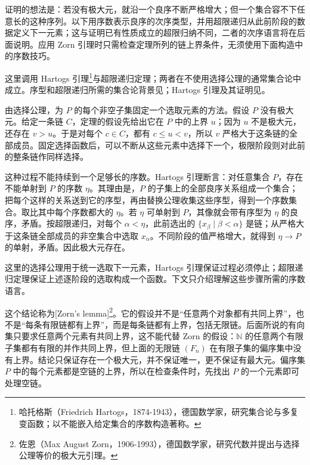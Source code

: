 \begin{proofsketch}
	证明的想法是：若没有极大元，就沿一个良序不断严格增大；但一个集合容不下任意长的这种序列。以下用序数表示良序的次序类型，并用超限递归从此前阶段的数据定义下一元素；这与证明已有性质成立的超限归纳不同，二者的次序语言将在后面说明。应用 Zorn 引理时只需检查定理所列的链上界条件，无须使用下面构造中的序数技巧。

	这里调用 Hartogs 引理\footnote{哈托格斯（Friedrich Hartogs，1874-1943），德国数学家，研究集合论与多复变函数；以不能嵌入给定集合的序数构造著称。}与超限递归定理；两者在不使用选择公理的通常集合论中成立。序型和超限递归所需的集合论背景见\cite[Chapters 5--6]{Johnstone1987LogicSetTheory}；Hartogs 引理及其证明见\cite[Lemma 7.1]{Johnstone1987LogicSetTheory}。

	由选择公理，为 \(P\) 的每个非空子集固定一个选取元素的方法。假设 \(P\) 没有极大元。给定一条链 \(C\)，定理的假设先给出它在 \(P\) 中的上界 \(u\)；因为 \(u\) 不是极大元，还存在 \(v>u\)。于是对每个 \(c\in C\)，都有 \(c\leq u<v\)，所以 \(v\) 严格大于这条链的全部成员。固定选择函数后，可以不断从这些元素中选择下一个，极限阶段则对此前的整条链作同样选择。

	这种过程不能持续到一个足够长的序数。Hartogs 引理断言：对任意集合 \(P\)，存在不能单射到 \(P\) 的序数 \(\eta\)。其理由是，\(P\) 的子集上的全部良序关系组成一个集合；把每个这样的关系送到它的序型，再由替换公理收集这些序型，得到一个序数集合。取比其中每个序数都大的 \(\eta\)。若 \(\eta\) 可单射到 \(P\)，其像就会带有序型为 \(\eta\) 的良序，矛盾。按超限递归，对每个 \(\alpha<\eta\)，此前选出的 \(\{x_\beta\mid\beta<\alpha\}\) 是链；从严格大于这条链全部成员的非空集合中选取 \(x_\alpha\)。不同阶段的值严格增大，就得到 \(\eta\to P\) 的单射，矛盾。因此极大元存在。

	这里的选择公理用于统一选取下一元素，Hartogs 引理保证过程必须停止；超限递归定理保证上述逐阶段的选取构成一个函数。下文只介绍理解这些步骤所需的序数语言。
\end{proofsketch}

这个结论称为[Zorn's lemma]\footnote{佐恩（Max August Zorn，1906-1993），德国数学家，研究代数并提出与选择公理等价的极大元引理。}。它的假设并不是“任意两个对象都有共同上界”，也不是“每条有限链都有上界”，而是每条链都有上界，包括无限链。后面所说的有向集只要求任意两个元素有共同上界，这不能代替 Zorn 的假设：\(\mathbb N\) 的任意两个有限子集都有有限的并作共同上界，但上面的无限链 \((F_n)\) 在有限子集的偏序集中没有上界。结论只保证存在一个极大元，并不保证唯一，更不保证有最大元。偏序集 \(P\) 中的每个元素都是空链的上界，所以在检查条件时，先找出 \(P\) 的一个元素即可处理空链。

